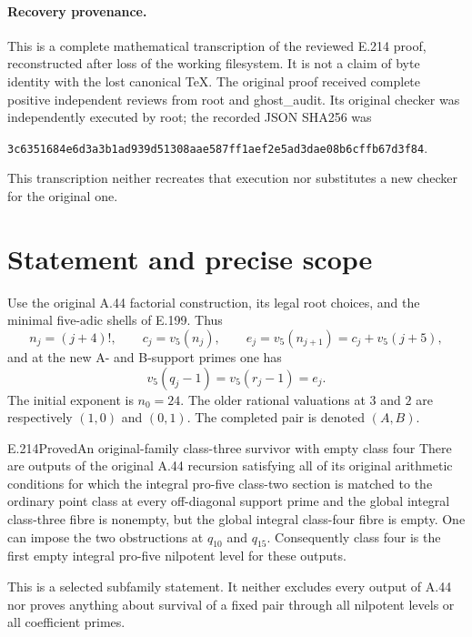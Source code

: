 \paragraph{Recovery provenance.}
This is a complete mathematical transcription of the reviewed E.214 proof, reconstructed after loss of the working filesystem. It is not a claim of byte identity with the lost canonical TeX. The original proof received complete positive independent reviews from root and ghost\_audit. Its original checker was independently executed by root; the recorded JSON SHA256 was
\begin{center}\texttt{3c6351684e6d3a3b1ad939d51308aae587ff1aef2e5ad3dae08b6cffb67d3f84}.\end{center}
This transcription neither recreates that execution nor substitutes a new checker for the original one.

\section*{Statement and precise scope}
Use the original A.44 factorial construction, its legal root choices, and the minimal five-adic shells of E.199. Thus
\[
 n_j=(j+4)!,\qquad c_j=v_5(n_j),\qquad
 e_j=v_5(n_{j+1})=c_j+v_5(j+5),
\]
and at the new A- and B-support primes one has
\[
 v_5(q_j-1)=v_5(r_j-1)=e_j.
\]
The initial exponent is $n_0=24$. The older rational valuations at $3$ and $2$ are respectively $(1,0)$ and $(0,1)$. The completed pair is denoted $(A,B)$.

\begin{result}{E.214}{Proved}{An original-family class-three survivor with empty class four}
There are outputs of the original A.44 recursion satisfying all of its original arithmetic conditions for which the integral pro-five class-two section is matched to the ordinary point class at every off-diagonal support prime and the global integral class-three fibre is nonempty, but the global integral class-four fibre is empty. One can impose the two obstructions at $q_{10}$ and $q_{15}$. Consequently class four is the first empty integral pro-five nilpotent level for these outputs.

This is a selected subfamily statement. It neither excludes every output of A.44 nor proves anything about survival of a fixed pair through all nilpotent levels or all coefficient primes.
\end{result}

